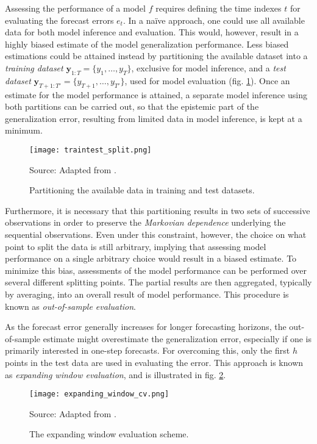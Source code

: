 Assessing the performance of a model $f$ requires defining the time indexes $t$ for evaluating the forecast errors $e_{t}$.
In a naïve approach, one could use all available data for both model inference and evaluation. This would, however, result in a highly biased estimate of the model generalization performance. Less biased estimations could be attained instead by partitioning the available dataset into a \textit{training dataset} $\boldsymbol{y} _{1:T} = \{y_1,…,y_T\}$, exclusive for model inference, and a \textit{test dataset} $\boldsymbol{y} _{T+1:T'} = \{y_{T+1},…,y_{T'}\}$, used for model evaluation (fig. \ref{fig:training_test_split}). Once an estimate for the model performance is attained, a separate model inference using both partitions can be carried out, so that the epistemic part of the generalization error, resulting from limited data in model inference, is kept at a minimum.
\begin{figure}[H]%
   \centering
    \caption{Partitioning the available data in training and test datasets.}
    \texttt{[image: traintest\_split.png]} \\
    \raggedright
    Source: Adapted from \cite{krispin2019handson}.
   \label{fig:training_test_split}
\end{figure}

Furthermore, it is necessary that this partitioning results in two sets of successive observations in order to preserve the \textit{Markovian dependence} underlying the sequential observations. Even under this constraint, however, the choice on what point to split the data is still arbitrary, implying that assessing model performance on a single arbitrary choice would result in a biased estimate. To minimize this bias, assessments of the model performance can be performed over several different splitting points. The partial results are then aggregated, typically by averaging, into an overall result of model performance. This procedure is known as \textit{out-of-sample evaluation}.

As the forecast error generally increases for longer forecasting horizons, the out-of-sample estimate might overestimate the generalization error, especially if one is primarily interested in one-step forecasts.
For overcoming this, only the first $h$ points in the test data are used in evaluating the error.
This approach is known as \textit{expanding window evaluation}, and is illustrated in fig. \ref{fig:expanding_window_cv}.
\begin{figure}[H]%
   \centering
    \caption{The expanding window evaluation scheme.}
    \texttt{[image: expanding\_window\_cv.png]} \\
    \raggedright
    Source: Adapted from \cite{krispin2019handson}.
   \label{fig:expanding_window_cv}
\end{figure}


